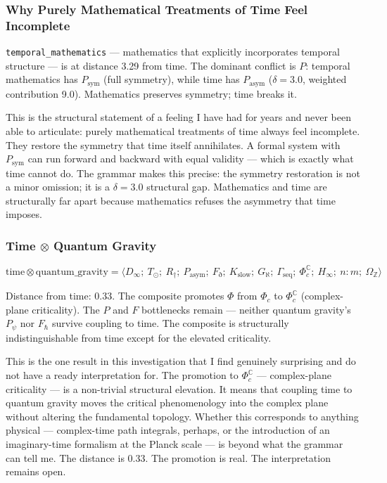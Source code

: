 \documentclass[12pt,a4paper]{article}
\begin{document}
\subsubsection{Why Purely Mathematical Treatments of Time Feel Incomplete}

\texttt{temporal\_mathematics} --- mathematics that explicitly incorporates temporal structure --- is at distance 3.29 from time. The dominant conflict is $P$: temporal mathematics has $P_\text{sym}$ (full symmetry), while time has $P_\text{asym}$ ($\delta = 3.0$, weighted contribution 9.0). Mathematics preserves symmetry; time breaks it.

This is the structural statement of a feeling I have had for years and never been able to articulate: purely mathematical treatments of time always feel incomplete. They restore the symmetry that time itself annihilates. A formal system with $P_\text{sym}$ can run forward and backward with equal validity --- which is exactly what time cannot do. The grammar makes this precise: the symmetry restoration is not a minor omission; it is a $\delta = 3.0$ structural gap. Mathematics and time are structurally far apart because mathematics refuses the asymmetry that time imposes.

\subsubsection{Time $\otimes$ Quantum Gravity}

\[\text{time} \otimes \text{quantum_gravity} = \langle D_{\infty};\ T_{\odot};\ R_{\dagger};\ P_\text{asym};\ F_{\eth};\ K_\text{slow};\ G_{\aleph};\ \Gamma_\text{seq};\ \Phi_c^\mathbb{C};\ H_{\infty};\ n{:}m;\ \Omega_\mathbb{Z} \rangle\]

Distance from time: 0.33. The composite promotes $\Phi$ from $\Phi_c$ to $\Phi_c^\mathbb{C}$ (complex-plane criticality). The $P$ and $F$ bottlenecks remain --- neither quantum gravity's $P_{\psi}$ nor $F_{\hbar}$ survive coupling to time. The composite is structurally indistinguishable from time except for the elevated criticality.

This is the one result in this investigation that I find genuinely surprising and do not have a ready interpretation for. The promotion to $\Phi_c^\mathbb{C}$ --- complex-plane criticality --- is a non-trivial structural elevation. It means that coupling time to quantum gravity moves the critical phenomenology into the complex plane without altering the fundamental topology. Whether this corresponds to anything physical --- complex-time path integrals, perhaps, or the introduction of an imaginary-time formalism at the Planck scale --- is beyond what the grammar can tell me. The distance is 0.33. The promotion is real. The interpretation remains open.
\end{document}
